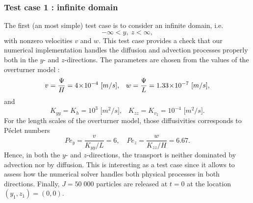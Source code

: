 \subsubsection*{Test case 1 : infinite domain}
The first (an most simple) test case is to consider an infinite domain, i.e.
\begin{equation} \label{eq:testcase:domain}
	-\infty < y,\; z < \infty,
\end{equation}
with nonzero velocities $v$ and $w$. This test case provides a check that our numerical implementation handles the diffusion and advection processes properly both in the $y$- and $z$-directions. The parameters are chosen from the values of the overturner model :
\begin{equation}
	v = \frac{\Psi}{H} = 4\!\times\!10^{-4}\mbox{ [$m/s$],}\quad  w = \frac{\Psi}{L}=1.33\!\times\!10^{-7}\mbox{ [$m/s$],}
\end{equation}
and
\begin{equation}
	K_{yy} = K_h = 10^{3} \mbox{ [$m^2/s$],}\quad K_{zz} = K_{v_{2}} = 10^{-4} \mbox{ [$m^2/s$].} 
\end{equation}
For the length scales of the overturner model, those diffusivities corresponds to Péclet numbers
\begin{equation}
	Pe_y = \frac{v}{K_{yy}/L} = 6,\quad Pe_z = \frac{w}{K_{zz}/H} = 6.67.
\end{equation}
Hence, in both the $y$- and $z$-directions, the transport is neither dominated by advection nor by diffusion. This is interesting as a test case since it allows to assess how the numerical solver handles both physical processes in both directions. 
Finally, $J = 50\;000$ particles are released at $t=0$ at the location $(y_1,z_1) = (0,0)$.

